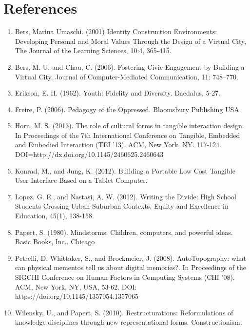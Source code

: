 \documentclass{sigchi-ext}
\begin{document}

\section{References}
\vspace{4mm}

\begin{enumerate}\compresslist
	\item Bers, Marina Umaschi. (2001) Identity Construction Environments: Developing Personal and Moral Values Through the Design of a Virtual City, The Journal of the Learning Sciences, 10:4, 365-415.

	\item Bers, M. U. and Chau, C. (2006). Fostering Civic Engagement by Building a Virtual City. Journal of Computer-Mediated Communication, 11: 748–770.

	\item Erikson, E. H. (1962). Youth: Fidelity and Diversity. Daedalus, 5-27.

	\item Freire, P. (2006). Pedagogy of the Oppressed. Bloomsbury Publishing USA.

	\item Horn, M. S. (2013). The role of cultural forms in tangible interaction design. In Proceedings of the 7th International Conference on Tangible, Embedded and Embodied Interaction (TEI '13). ACM, New York, NY. 117-124. DOI=http://dx.doi.org/10.1145/2460625.2460643 

	\item Konrad, M., and Jung, K. (2012). Building a Portable Low Cost Tangible User Interface Based on a Tablet Computer.

	\item Lopez, G. E., and Nastasi, A. W. (2012). Writing the Divide: High School Students Crossing Urban-Suburban Contexts. Equity and Excellence in Education, 45(1), 138-158.		

	\item Papert, S. (1980). Mindstorms: Children, computers, and powerful ideas. Basic Books, Inc.. Chicago

	\item Petrelli, D. Whittaker, S., and Brockmeier, J. (2008). AutoTopography: what can physical mementos tell us about digital memories?. In Proceedings of the SIGCHI Conference on Human Factors in Computing Systems (CHI '08). ACM, New York, NY, USA, 53-62. DOI: https://doi.org/10.1145/1357054.1357065

	\item Wilensky, U., and Papert, S. (2010). Restructurations: Reformulations of knowledge disciplines through new representational forms. Constructionism.
\end{enumerate}




%
%
\end{document}
